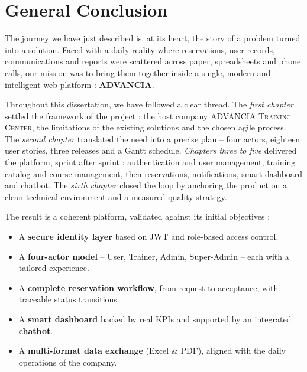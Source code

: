 
\chapter*{General Conclusion}


\noindent
The journey we have just described is, at its heart, the story of a problem turned into a solution. Faced with a daily reality where reservations, user records, communications and reports were scattered across paper, spreadsheets and phone calls, our mission was to bring them together inside a single, modern and intelligent web platform : \textbf{ADVANCIA}.

\medskip
\noindent
Throughout this dissertation, we have followed a clear thread. The \textit{first chapter} settled the framework of the project : the host company \textsc{ADVANCIA Training Center}, the limitations of the existing solutions and the chosen agile process. The \textit{second chapter} translated the need into a precise plan -- four actors, eighteen user stories, three releases and a Gantt schedule. \textit{Chapters three to five} delivered the platform, sprint after sprint : authentication and user management, training catalog and course management, then reservations, notifications, smart dashboard and chatbot. The \textit{sixth chapter} closed the loop by anchoring the product on a clean technical environment and a measured quality strategy.

\medskip
\noindent
The result is a coherent platform, validated against its initial objectives :

\begin{itemize}[leftmargin=2.2em,itemsep=0.4em]
  \item A \textbf{secure identity layer} based on JWT and role-based access control.
  \item A \textbf{four-actor model} -- User, Trainer, Admin, Super-Admin -- each with a tailored experience.
  \item A \textbf{complete reservation workflow}, from request to acceptance, with traceable status transitions.
  \item A \textbf{smart dashboard} backed by real KPIs and supported by an integrated \textbf{chatbot}.
  \item A \textbf{multi-format data exchange} (Excel \& PDF), aligned with the daily operations of the company.
\end{itemize}

